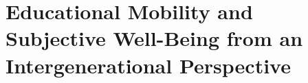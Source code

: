 \chapter{Educational Mobility and Subjective Well-Being from an Intergenerational Perspective}
\label{chap:edu-mobility-swb}









